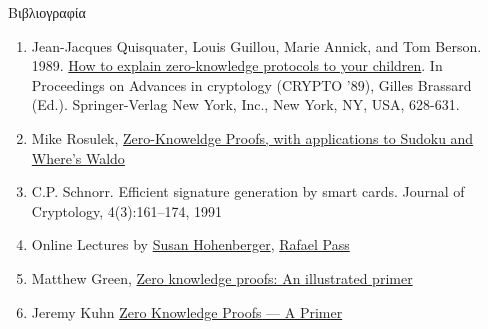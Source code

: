 \documentclass[handout]{beamer}
\begin{document}
\begin{frame}[allowframebreaks]{Βιβλιογραφία}
\begin{tiny}
\begin{enumerate}
\item  Jean-Jacques Quisquater, Louis Guillou, Marie Annick, and Tom Berson. 1989. \href{http://pages.cs.wisc.edu/~mkowalcz/628.pdf}{How to explain zero-knowledge protocols to your children}. In Proceedings on Advances in cryptology (CRYPTO '89), Gilles Brassard (Ed.). Springer-Verlag New York, Inc., New York, NY, USA, 628-631.  
\item Mike Rosulek, \href{http://web.engr.oregonstate.edu/~rosulekm/pubs/zk-waldo-talk.pdf}{Zero-Knoweldge Proofs, with applications to Sudoku and Where’s Waldo}
\item  C.P. Schnorr. Efficient signature generation by smart cards. Journal of Cryptology, 4(3):161–174, 1991
\item Online Lectures by \href{http://www.cs.jhu.edu/~susan/600.641/}{Susan Hohenberger},  \href{http://www.cs.cornell.edu/courses/cs6830/2014fa/}{Rafael Pass}
\item  Matthew Green, \href{http://blog.cryptographyengineering.com/2014/11/zero-knowledge-proofs-illustrated-primer.html}{Zero knowledge proofs: An illustrated primer}
\item Jeremy Kuhn \href{https://jeremykun.com/2016/07/05/zero-knowledge-proofs-a-primer/}{Zero Knowledge Proofs — A Primer}
\end{enumerate}
\end{tiny}
\end{frame}
\end{document}
